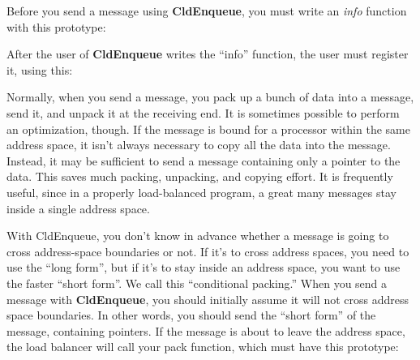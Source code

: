 Before you send a message using {\bf CldEnqueue}, you must write an
{\sl info} function with this prototype:


After the user of {\bf CldEnqueue} writes the ``info'' function, the
user must register it, using this:


Normally, when you send a message, you pack up a bunch of data into a
message, send it, and unpack it at the receiving end.  It is sometimes
possible to perform an optimization, though.  If the message is bound
for a processor within the same address space, it isn't always
necessary to copy all the data into the message.  Instead, it may be
sufficient to send a message containing only a pointer to the data.
This saves much packing, unpacking, and copying effort.  It is
frequently useful, since in a properly load-balanced program, a great
many messages stay inside a single address space.

With CldEnqueue, you don't know in advance whether a message is
going to cross address-space boundaries or not.  If it's to cross
address spaces, you need to use the ``long form'', but if it's to stay
inside an address space, you want to use the faster ``short form''.
We call this ``conditional packing.''  When you send a message with
{\bf CldEnqueue}, you should initially assume it will not cross
address space boundaries.  In other words, you should send the ``short
form'' of the message, containing pointers.  If the message is about
to leave the address space, the load balancer will call your pack
function, which must have this prototype:

